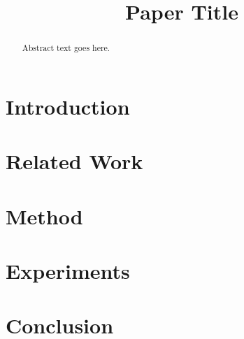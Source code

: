 \documentclass[conference]{IEEEtran}
\title{Paper Title}
\author{
  \IEEEauthorblockN{Anonymous Author(s)}
  \IEEEauthorblockA{Anonymous Institution}
}
\begin{document}
\maketitle

\begin{abstract}
Abstract text goes here.
\end{abstract}

\section{Introduction}

\section{Related Work}

\section{Method}

\section{Experiments}

\section{Conclusion}

\clearpage


\end{document}
